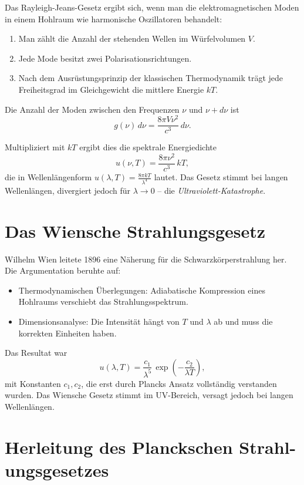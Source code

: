 Das Rayleigh-Jeans-Gesetz ergibt sich, wenn man die elektromagnetischen
Moden in einem Hohlraum wie harmonische Oszillatoren behandelt:

\begin{enumerate}
	\item Man zählt die Anzahl der stehenden Wellen im Würfelvolumen $V$.
	\item Jede Mode besitzt zwei Polarisationsrichtungen.
	\item Nach dem Ausrüstungsprinzip der klassischen Thermodynamik trägt
	jede Freiheitsgrad im Gleichgewicht die mittlere Energie $kT$.
\end{enumerate}

Die Anzahl der Moden zwischen den Frequenzen $\nu$ und $\nu + d\nu$ ist
\[
g(\nu)\, d\nu = \frac{8\pi V \nu^2}{c^3}\, d\nu.
\]

Multipliziert mit $kT$ ergibt dies die spektrale Energiedichte
\[
u(\nu, T) = \frac{8\pi \nu^2}{c^3}\, kT,
\]
die in Wellenlängenform $u(\lambda, T) = \tfrac{8\pi kT}{\lambda^4}$ lautet.
Das Gesetz stimmt bei langen Wellenlängen, divergiert jedoch für
$\lambda \to 0$ – die \emph{Ultraviolett-Katastrophe}.

\section{Das Wiensche Strahlungsgesetz}
\label{anhangA:wien}

Wilhelm Wien leitete 1896 eine Näherung für die Schwarzkörperstrahlung her.
Die Argumentation beruhte auf:

\begin{itemize}
	\item Thermodynamischen Überlegungen: Adiabatische Kompression eines
	Hohlraums verschiebt das Strahlungsspektrum.
	\item Dimensionsanalyse: Die Intensität hängt von $T$ und $\lambda$ ab
	und muss die korrekten Einheiten haben.
\end{itemize}

Das Resultat war
\[
u(\lambda, T) = \frac{c_1}{\lambda^5}\,
\exp\!\left(-\frac{c_2}{\lambda T}\right),
\]
mit Konstanten $c_1, c_2$, die erst durch Plancks Ansatz vollständig
verstanden wurden. Das Wiensche Gesetz stimmt im UV-Bereich,
versagt jedoch bei langen Wellenlängen.

\section{Herleitung des Planckschen Strahl-\newline ungsgesetzes}
\label{anhangA:planck}

